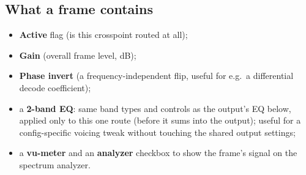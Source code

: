 \subsection{What a frame contains}
\begin{itemize}[nosep]
  \item \textbf{Active} flag (is this crosspoint routed at all);
  \item \textbf{Gain} (overall frame level, dB);
  \item \textbf{Phase invert} (a frequency-independent  flip, useful for
        e.g.\ a differential decode coefficient);
  \item a \textbf{2-band EQ}: same band types and controls as the output's EQ
        below, applied only to this one route (before it sums into the
        output); useful for a config-specific voicing tweak without touching
        the shared output settings;
  \item a \textbf{vu-meter} and an \textbf{analyzer} checkbox to show the
        frame's signal on the spectrum analyzer.
\end{itemize}

